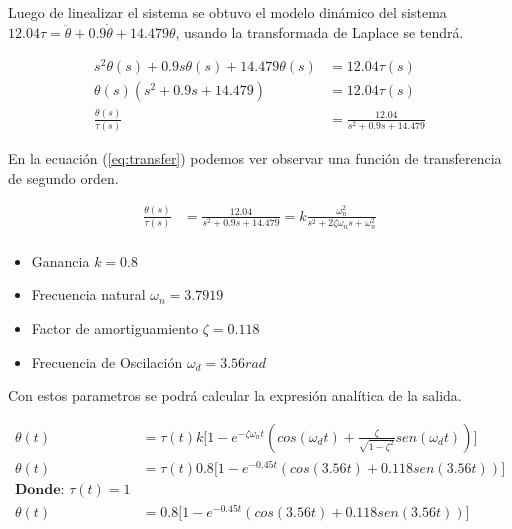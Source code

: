 \documentclass[12pt]{article}
\begin{document}
Luego de linealizar el sistema se obtuvo el modelo dinámico del sistema $12.04\tau=\ddot{\theta}+0.9\dot{\theta}+14.479\theta$, usando la transformada de Laplace se tendrá.

\begin{equation}
    \begin{split}
        s^2\theta(s)+0.9s\theta(s)+14.479\theta(s)&=12.04\tau(s)\\
        \theta(s)(s^2+0.9s+14.479)&=12.04\tau(s)\\
        \frac{\theta(s)}{\tau(s)}&=\frac{12.04}{s^2+0.9s+14.479}
    \end{split}
    \label{eq:transfer}
\end{equation}

En la ecuación (\ref{eq:transfer}) podemos ver observar una función de transferencia de segundo orden\cite[Página~165]{katsuhiko2010modern}.

\begin{equation}
    \begin{split}
        \frac{\theta(s)}{\tau(s)}&=\frac{12.04}{s^2+0.9s+14.479}=k\frac{\omega_n^2}{s^2+2\zeta\omega_n s+\omega_n^2}\\
    \end{split}
    \label{eq:compara}
\end{equation}

\begin{itemize}
    \item Ganancia $k=0.8$
    \item Frecuencia natural $\omega_n=3.7919$
    \item Factor de amortiguamiento $\zeta=0.118$
    \item Frecuencia de Oscilación $\omega_d=3.56rad$
\end{itemize}

Con estos parametros se podrá calcular la expresión analítica de la salida.

\begin{equation}
    \begin{split}
        \theta(t)&=\tau(t)k\lbrack1-e^{-\zeta\omega_n t}(cos(\omega_d t)+\frac{\zeta}{\sqrt{1-\zeta^2}}sen(\omega_d t))\rbrack\\
        \theta(t)&=\tau(t)0.8\lbrack1-e^{-0.45t}(cos(3.56t)+0.118sen(3.56t))\rbrack\\
        \textbf{Donde: }\tau(t)=1&\\
        \theta(t)&=0.8\lbrack1-e^{-0.45t}(cos(3.56t)+0.118sen(3.56t))\rbrack\\
    \end{split}
    \label{eq:salida}
\end{equation}
\end{document}
